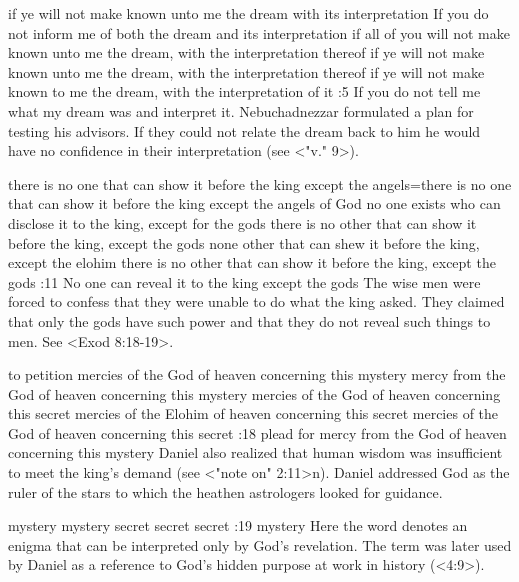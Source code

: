     {if ye will not make known unto me the dream with its interpretation} %
    {If you do not inform me of both the dream and its interpretation} %
    {if all of you will not make known unto me the dream, with the interpretation thereof} %
    {if ye will not make known unto me the dream, with the interpretation thereof} %
    {if ye will not make known to me the dream, with the interpretation of it} %
:5 {If you do not tell me what my dream was and interpret it. }
Nebuchadnezzar formulated a plan for testing his advisors. If they 
could not relate the dream back to him he would have no confidence in their interpretation (see <"v." 9>).


    {there is no one that can show it before the king except the angels}={there is no one that can show it before the king except the angels of God} %
    {no one exists who can disclose it to the king, except for the gods} %
    {there is no other that can show it before the king, except the gods} %
    {none other that can shew it before the king, except the elohim} %
    {there is no other that can show it before the king, except the gods} %
:11 {No one can reveal it to the king except the gods} The 
wise men were forced to confess that they were unable to do what 
the king asked. They claimed that only the gods have such power 
and that they do not reveal such things to men. See <Exod 8:18-19>. 

    {to petition mercies of the God of heaven concerning this mystery} %
    {mercy from the God of heaven concerning this mystery} %
    {mercies of the God of heaven concerning this secret} %
    {mercies of the Elohim of heaven concerning this secret} %
    {mercies of  the God of heaven concerning this secret} %
:18 {plead for mercy from the God of heaven concerning this 
mystery} Daniel also realized that human wisdom was insufficient 
to meet the king's demand (see <"note on" 2:11>n). Daniel addressed 
God as the ruler of the stars to which the heathen astrologers 
looked for guidance.

    {mystery} %
    {mystery} %
    {secret} %
    {secret} %
    {secret} %
:19 {mystery} Here the word denotes an enigma that can be interpreted only by God's revelation. The
term was later used by Daniel as a reference to God's hidden purpose at work in history (<4:9>).


